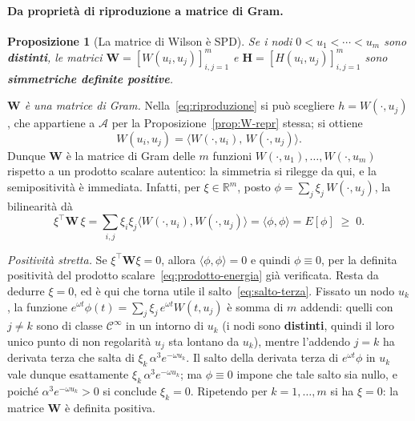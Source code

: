 \documentclass[11pt,a4paper]{article}
\theoremstyle{plain}
\newtheorem{proposizione}[teorema]{Proposizione}
\theoremstyle{definition}
\theoremstyle{remark}
\newcommand{\Hmat}{\mathbf{H}}
\newcommand{\transp}{^{\!\top}}
\begin{document}
\paragraph{Da propriet\`a di riproduzione a matrice di Gram.}

\begin{proposizione}[La matrice di Wilson \`e SPD]
\label{prop:H-spd}
Se i nodi $0<u_1<\cdots<u_m$ sono \textbf{distinti}, le matrici
$\mathbf{W}=[W(u_i,u_j)]_{i,j=1}^m$ e $\Hmat=[H(u_i,u_j)]_{i,j=1}^m$ sono
\textbf{simmetriche definite positive}.
\end{proposizione}

\emph{$\mathbf{W}$ \`e una matrice di Gram.} Nella~\eqref{eq:riproduzione} si pu\`o scegliere
$h = W(\cdot,u_j)$, che appartiene a $\mathcal{A}$ per la Proposizione~\ref{prop:W-repr}
stessa; si ottiene
\begin{equation}
  W(u_i,u_j) = \bigl\langle W(\cdot,u_i),\,W(\cdot,u_j) \bigr\rangle .
  \label{eq:gram-W}
\end{equation}
Dunque $\mathbf{W}$ \`e la matrice di Gram delle $m$ funzioni $W(\cdot,u_1),\dots,W(\cdot,u_m)$
rispetto a un prodotto scalare autentico: la simmetria si rilegge da qui, e la
semipositivit\`a \`e immediata. Infatti, per $\xi\in\mathbb{R}^m$, posto
$\phi = \sum_{j} \xi_j\,W(\cdot,u_j)$, la bilinearit\`a d\`a
\begin{equation}
  \xi\transp\mathbf{W}\,\xi
  = \sum_{i,j}\xi_i\xi_j\bigl\langle W(\cdot,u_i),W(\cdot,u_j)\bigr\rangle
  = \langle \phi,\phi\rangle = E[\phi] \;\ge\; 0 .
  \label{eq:gram-quadratica}
\end{equation}

\emph{Positivit\`a stretta.} Se $\xi\transp\mathbf{W}\xi = 0$, allora $\langle\phi,\phi\rangle=0$
e quindi $\phi\equiv 0$, per la definita positivit\`a del prodotto
scalare~\eqref{eq:prodotto-energia} gi\`a verificata. Resta da dedurre $\xi=0$, ed \`e qui che
torna utile il salto~\eqref{eq:salto-terza}. Fissato un nodo $u_k$, la funzione
$e^{\omega t}\phi(t) = \sum_j \xi_j\,e^{\omega t}W(t,u_j)$ \`e somma di $m$ addendi: quelli con
$j\neq k$ sono di classe $\mathcal{C}^\infty$ in un intorno di $u_k$ (i nodi sono
\textbf{distinti}, quindi il loro unico punto di non regolarit\`a $u_j$ sta lontano da $u_k$),
mentre l'addendo $j=k$ ha derivata terza che salta di $\xi_k\,\alpha^{3}e^{-\omega u_k}$.
Il salto della derivata terza di $e^{\omega t}\phi$ in $u_k$ vale dunque esattamente
$\xi_k\,\alpha^{3}e^{-\omega u_k}$; ma $\phi\equiv 0$ impone che tale salto sia nullo, e
poich\'e $\alpha^{3}e^{-\omega u_k}>0$ si conclude $\xi_k = 0$. Ripetendo per
$k=1,\dots,m$ si ha $\xi = 0$: la matrice $\mathbf{W}$ \`e definita positiva.
\end{document}
